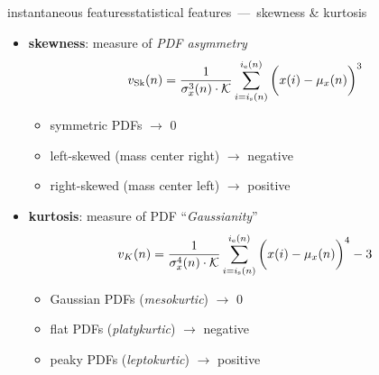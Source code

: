         \begin{frame}{instantaneous features}{statistical features~---~skewness \& kurtosis}
            \begin{itemize}
                \item \textbf{skewness}: measure of \textit{PDF asymmetry}
                    \begin{equation*}
                        v_{\mathrm{Sk}}(n) = {\frac{1}{\sigma_x^3(n)\cdot \mathcal{K}}\sum\limits_{i=i_{\mathrm{s}}(n)}^{i_{\mathrm{e}}(n)}{\left(\vphantom{\frac{1}{1}}x(i)-\mu_x(n)\right)^3}} 
                    \end{equation*}
                    \begin{footnotesize}
                            \begin{itemize}
                                \item<2->	symmetric PDFs $\rightarrow$ $0$
                                \item<2->	left-skewed (mass center right) $\rightarrow$ negative
                                \item<2->	right-skewed (mass center left) $\rightarrow$ positive 
                            \end{itemize}
                    \end{footnotesize}
                \item<3-> \textbf{kurtosis}: measure of PDF ``\textit{Gaussianity}''
                    \begin{equation*}
                        v_{K}(n) = {\frac{1}{\sigma_x^4(n)\cdot \mathcal{K}}\sum\limits_{i=i_{\mathrm{s}}(n)}^{i_{\mathrm{e}}(n)}{\left(\vphantom{\frac{1}{1}}x(i)-\mu_x(n)\right)^4}} - 3 
                    \end{equation*}
                    \begin{footnotesize}
                            \begin{itemize}
                                \item<4->	Gaussian PDFs (\textit{mesokurtic})  $\rightarrow$ 0
                                \item<4->	flat PDFs (\textit{platykurtic}) $\rightarrow$ negative
                                \item<4->	peaky PDFs (\textit{leptokurtic})  $\rightarrow$ positive
                            \end{itemize}	
                    \end{footnotesize}
            \end{itemize}
        \end{frame}
